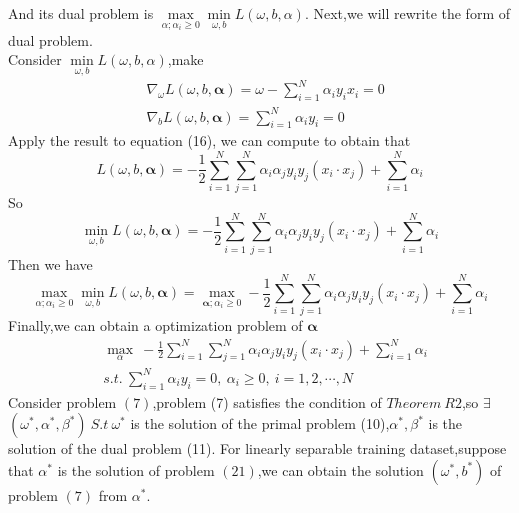 And its dual problem is $\max\limits_{\alpha;\alpha_{i}\geq 0}\min\limits_{\omega,b}L(\omega,b,\alpha)$.
Next,we will rewrite the form of dual problem.
\\Consider $\min\limits_{\omega,b}L(\omega,b,\alpha)$,make
\begin{equation}
\begin{split}
&\nabla_{\omega} L(\omega, b, \bm \alpha)=\omega-\sum\limits_{i=1}^{N}\alpha_{i}y_{i}x_{i}=0\\
&\nabla_{b} L(\omega, b, \bm \alpha)=\sum\limits_{i=1}^{N}\alpha_{i}y_{i}=0
\end{split}
\end{equation}
Apply the result to equation (16), we can compute to obtain that
\begin{equation}
L(\omega,b,\bm\alpha)=-\frac{1}{2}\sum\limits_{i=1}^{N}\sum\limits_{j=1}^{N}\alpha_{i}\alpha_{j}y_{i}y_{j}(x_{i}\cdot x_{j})+\sum\limits_{i=1}^{N}\alpha_{i}
\end{equation}
So
\begin{equation}
\min\limits_{\omega,b}L(\omega,b,\bm\alpha)=-\frac{1}{2}\sum\limits_{i=1}^{N}\sum\limits_{j=1}^{N}\alpha_{i}\alpha_{j}y_{i}y_{j}(x_{i}\cdot x_{j})+\sum\limits_{i=1}^{N}\alpha_{i}
\end{equation}
Then we have
\begin{equation}
\max\limits_{\alpha;\alpha_{i}\geq 0}\min\limits_{\omega,b}L(\omega,b,\bm\alpha)=\max\limits_{\bm\alpha;\alpha_{i}\geq 0}-\frac{1}{2}\sum\limits_{i=1}^{N}\sum\limits_{j=1}^{N}\alpha_{i}\alpha_{j}y_{i}y_{j}(x_{i}\cdot x_{j})+\sum\limits_{i=1}^{N}\alpha_{i}
\end{equation}
Finally,we can obtain a optimization problem of $\bm\alpha$
\begin{equation}
\begin{split}
&\max_{\alpha}\  -\frac{1}{2}\sum\limits_{i=1}^{N}\sum\limits_{j=1}^{N}\alpha_{i}\alpha_{j}y_{i}y_{j}(x_{i}\cdot x_{j})+\sum\limits_{i=1}^{N}\alpha_{i}\\
&s.t.\  \sum\limits_{i=1}^{N}\alpha_{i}y_{i}=0,\ \alpha_{i}\geq 0,\ i=1,2,\cdots,N
\end{split}
\end{equation}
Consider problem $(7)$,problem (7) satisfies the condition of $Theorem\ R2$,so $\exists$ $(\omega^*,\alpha^*,\beta^*)\ S.t\ \omega^*$ is the solution of the primal problem (10),$\alpha^*,\beta^*$ is the solution of the dual problem (11).
For linearly separable training dataset,suppose that $\alpha^*$ is the solution of problem $(21)$,we can obtain the solution $(\omega^*,b^*)$ of problem $(7)$ from $\alpha^*$.

